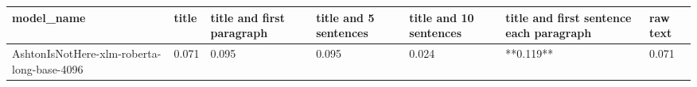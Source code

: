 \begin{tabular}{lllllll}
\toprule
                                model\_name & title & title and first paragraph & title and 5 sentences & title and 10 sentences & title and first sentence each paragraph & raw text \\
\midrule
AshtonIsNotHere-xlm-roberta-long-base-4096 & 0.071 &                     0.095 &                 0.095 &                  0.024 &                               **0.119** &    0.071 \\
\bottomrule
\end{tabular}
